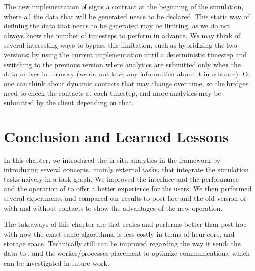 The new implementation of \deisa signs a contract at the beginning of the simulation, where all the data that will be generated needs to be declared. This static way of defining the data that needs to be generated may be limiting, as we do not always know the number of timesteps to perform in advance. 
We may think of several interesting ways to bypass this limitation, such as hybridizing the two versions: by using the current implementation until a deterministic timestep and switching to the previous version where analytics are submitted only when the data arrives in memory (we do not have any information about it in advance). Or one can think about dynamic contacts that may change over time, so the bridges need to check the contacts at each timestep, and more analytics may be submitted by the client depending on that.

\section{Conclusion and Learned Lessons}
In this chapter, we introduced the in situ analytics in the \dask framework by introducing several concepts, mainly external tasks, that integrate the simulation tasks naively in a \dask task graph. We improved the interface and the performance and the operation of \deisa to offer a better experience for the users.
We then performed several experiments and compared our results to post hoc and the old version of \deisa with and without contacts to show the advantages of the new operation.

The takeaways of this chapter are that \deisa scales and performs better than post hoc with now the exact same algorithms. \deisa is less costly in terms of hour.core, and storage space. 
Technically \deisa still can be improved regarding the way it sends the data to \dask, and the worker/processes placement to optimize communications, which can be investigated in future work.  

